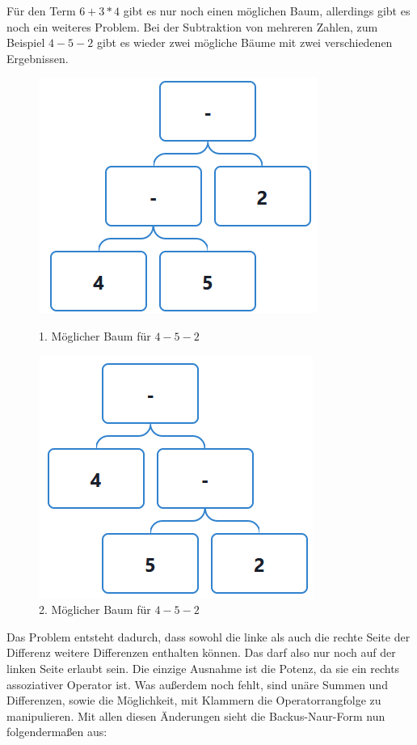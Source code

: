 \documentclass[11pt]{article}
\begin{document}
Für den Term $6+3*4$ gibt es nur noch einen möglichen Baum,
allerdings gibt es noch ein weiteres Problem. 
Bei der Subtraktion von mehreren Zahlen, 
zum Beispiel $4-5-2$ gibt es wieder zwei mögliche Bäume 
mit zwei verschiedenen Ergebnissen. 

\begin{figure}[h]
\begin{minipage}{.5\textwidth}
  \centering
  \includegraphics[scale=0.5]{trees/beispiel_bnf_3_1.png}
  \caption{1. Möglicher Baum für $4-5-2$}
\end{minipage}
\begin{minipage}{.5\textwidth}
  \centering
  \includegraphics[scale=0.5]{trees/beispiel_bnf_3_2.png}
  \caption{2. Möglicher Baum für $4-5-2$}
\end{minipage}
\end{figure}

Das Problem entsteht dadurch, dass sowohl die linke als auch 
die rechte Seite der Differenz weitere Differenzen enthalten können. 
Das darf also nur noch auf der linken Seite erlaubt sein. 
Die einzige Ausnahme ist die Potenz, da sie ein rechts assoziativer Operator ist. 
Was außerdem noch fehlt, sind unäre Summen und Differenzen, 
sowie die Möglichkeit, mit Klammern die Operatorrangfolge zu manipulieren. 
Mit allen diesen Änderungen sieht die Backus-Naur-Form nun folgendermaßen aus:
\end{document}
